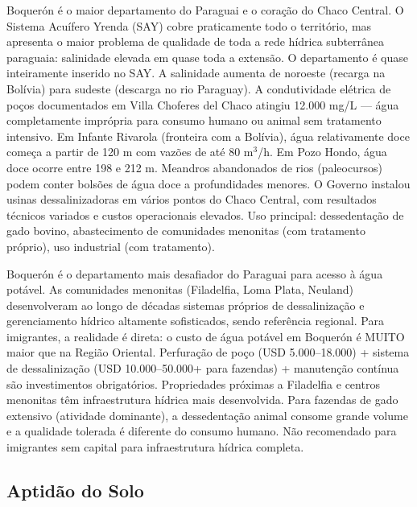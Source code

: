 Boquerón é o maior departamento do Paraguai e o coração do Chaco Central. O Sistema Acuífero Yrenda (SAY) cobre praticamente todo o território, mas apresenta o maior problema de qualidade de toda a rede hídrica subterrânea paraguaia: salinidade elevada em quase toda a extensão. O departamento é quase inteiramente inserido no SAY. A salinidade aumenta de noroeste (recarga na Bolívia) para sudeste (descarga no rio Paraguay). A condutividade elétrica de poços documentados em Villa Choferes del Chaco atingiu 12.000 mg/L --- água completamente imprópria para consumo humano ou animal sem tratamento intensivo. Em Infante Rivarola (fronteira com a Bolívia), água relativamente doce começa a partir de 120 m com vazões de até 80 m$^3$/h. Em Pozo Hondo, água doce ocorre entre 198 e 212 m. Meandros abandonados de rios (paleocursos) podem conter bolsões de água doce a profundidades menores. O Governo instalou usinas dessalinizadoras em vários pontos do Chaco Central, com resultados técnicos variados e custos operacionais elevados. Uso principal: dessedentação de gado bovino, abastecimento de comunidades menonitas (com tratamento próprio), uso industrial (com tratamento).

Boquerón é o departamento mais desafiador do Paraguai para acesso à água potável. As comunidades menonitas (Filadelfia, Loma Plata, Neuland) desenvolveram ao longo de décadas sistemas próprios de dessalinização e gerenciamento hídrico altamente sofisticados, sendo referência regional. Para imigrantes, a realidade é direta: o custo de água potável em Boquerón é MUITO maior que na Região Oriental. Perfuração de poço (USD 5.000--18.000) + sistema de dessalinização (USD 10.000--50.000+ para fazendas) + manutenção contínua são investimentos obrigatórios. Propriedades próximas a Filadelfia e centros menonitas têm infraestrutura hídrica mais desenvolvida. Para fazendas de gado extensivo (atividade dominante), a dessedentação animal consome grande volume e a qualidade tolerada é diferente do consumo humano. Não recomendado para imigrantes sem capital para infraestrutura hídrica completa.

\subsection*{Aptidão do Solo}

